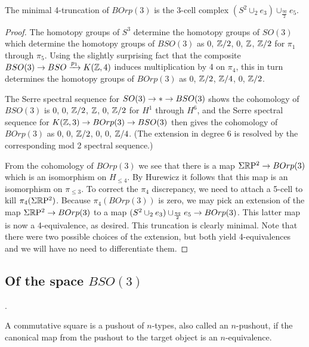 \documentclass{amsart}
\begin{document}
\begin{proposition} 
\label{prop-borptrunc}
The minimal 4-truncation of $BOrp(3)$ is the 3-cell complex $(S^2 \cup_2 e_3) \cup_{\frac{\eta q}{2}} e_5$.
\end{proposition}
\begin{proof}
The homotopy groups of $S^3$ determine the homotopy groups of $SO(3)$ which determine the homotopy groups of $BSO(3)$ as $0$, $\mathbb Z/2$, $0$, $\mathbb Z$, $\mathbb Z/2$ for $\pi_1$ through $\pi_5$.  Using the slightly surprising fact that the composite $BSO(3) \rightarrow BSO \xrightarrow{p_1} K(\mathbb Z,4)$ induces multiplication by 4 on $\pi_4$, this in turn determines the homotopy groups of $BOrp(3)$ as $0$, $\mathbb Z/2$, $\mathbb Z/4$, $0$, $\mathbb Z/2$.  

The Serre spectral sequence for $SO(3) \rightarrow * \rightarrow BSO(3)$ shows the cohomology of $BSO(3)$ is $0$, $0$, $\mathbb Z/2$, $\mathbb Z$, $0$, $\mathbb Z/2$ for $H^1$ through $H^6$, and the Serre spectral sequence for $K(\mathbb Z,3) \rightarrow BOrp(3) \rightarrow BSO(3)$ then gives the cohomology of $BOrp(3)$ as $0$, $0$, $\mathbb Z/2$, $0$, $0$, $\mathbb Z/4$.  (The extension in degree 6 is resolved by the corresponding mod 2 spectral sequence.)

From the cohomology of $BOrp(3)$ we see that there is a map $\Sigma \mathbb R \mathrm{P}^2 \rightarrow BOrp(3)$ which is an isomorphism on $H_{\leq 4}$.  By Hurewicz it follows that this map is an isomorphism on $\pi_{\leq 3}$.  To correct the $\pi_4$ discrepancy, we need to attach a 5-cell to kill $\pi_4(\Sigma \mathbb R \mathrm{P}^2)$.  Because $\pi_4(BOrp(3))$ is zero, we may pick an extension of the map $\Sigma \mathbb R \mathrm{P}^2 \rightarrow BOrp(3)$ to a map $(S^2 \cup_2 e_3) \cup_{\frac{\eta q}{2}} e_5 \rightarrow BOrp(3)$.  This latter map is now a 4-equivalence, as desired.  This truncation is clearly minimal.  Note that there were two possible choices of the extension, but both yield 4-equivalences and we will have no need to differentiate them.
\end{proof}

\subsection{Of the space $BSO(3)$}.


\begin{definition}
A commutative square is a pushout of $n$-types, also called an $n$-pushout, if the canonical map from the pushout to the target object is an $n$-equivalence.
\end{definition}
\end{document}
